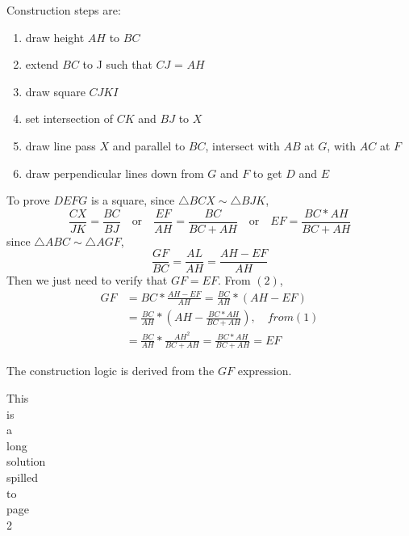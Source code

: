 \documentclass[12pt]{article}
\begin{document}
	\noindent
	Construction steps are:
	\begin{enumerate}[topsep=0pt,itemsep=-1ex,partopsep=1ex,parsep=1ex]
		\item draw height $AH$ to $BC$
		\item extend $BC$ to J such that $CJ$ = $AH$
		\item draw square $CJKI$
		\item set intersection of $CK$ and $BJ$ to $X$
		\item draw line pass $X$ and parallel to $BC$, intersect with $AB$ at $G$, with $AC$ at $F$
		\item draw perpendicular lines down from $G$ and $F$ to get $D$ and $E$
	\end{enumerate}

	\noindent
	To prove $DEFG$ is a square, since $\triangle BCX \sim \triangle BJK$,
	\begin{equation}
		\frac{CX}{JK} = \frac{BC}{BJ}
		\quad \textrm{or} \quad \frac{EF}{AH} = \frac{BC}{BC + AH}
		\quad \textrm{or} \quad EF = \frac{BC * AH}{BC + AH}
	\end{equation}
	since $\triangle ABC \sim \triangle AGF$,
	\begin{equation}
		\frac{GF}{BC} = \frac{AL}{AH} = \frac{AH - EF}{AH}
	\end{equation}
	Then we just need to verify that $GF = EF$. From $(2)$,
	\begin{equation}
		\begin{aligned}
		GF &= BC * \frac{AH - EF}{AH} = \frac{BC}{AH} *(AH - EF)\\
		   &= \frac{BC}{AH} * (AH - \frac{BC * AH}{BC + AH}), \quad from (1)\\
		   &= \frac{BC}{AH} * \frac{AH^2}{BC + AH} = \frac{BC * AH}{BC + AH} = EF
		\end{aligned}
	\end{equation}

	\noindent
	The construction logic is derived from the $GF$ expression.

	This\\
	is \\
	a \\
	long \\
	solution\\
	spilled\\
	to\\
	page\\
	2
\end{document}
